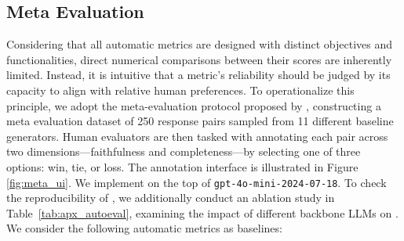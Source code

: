 \subsection{Meta Evaluation}
\label{apx:setup}
Considering that all automatic metrics are designed with distinct objectives and functionalities, direct numerical comparisons between their scores are inherently limited. 
Instead, it is intuitive that a metric’s reliability should be judged by its capacity to align with relative human preferences. 
To operationalize this principle, we adopt the meta-evaluation protocol proposed by \citet{ru2024ragchecker}, constructing a meta evaluation dataset of 250 response pairs sampled from 11 different baseline generators.
Human evaluators are then tasked with annotating each pair across two dimensions—faithfulness and completeness—by selecting one of three options: win, tie, or loss.
The annotation interface is illustrated in Figure \ref{fig:meta_ui}.
We implement \eval on the top of \texttt{gpt-4o-mini-2024-07-18}. 
To check the reproducibility of \eval, we additionally conduct an ablation study in Table~\ref{tab:apx_autoeval}, examining the impact of different backbone LLMs on \eval.
 We consider the following automatic metrics as baselines:


